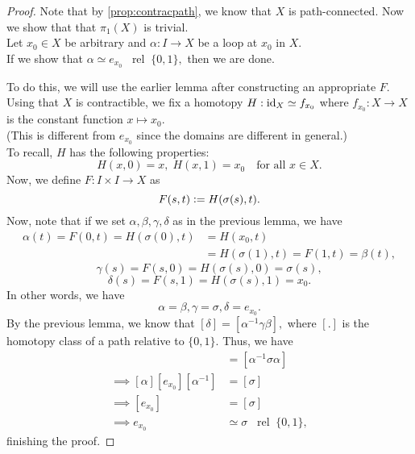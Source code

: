 \documentclass[12pt]{article}
\newcommand{\rel}{\;\;\operatorname{rel}\;}
\begin{document}
\begin{proof} 
	Note that by \cref{prop:contracpath}, we know that $X$ is path-connected. Now we show that that $\pi_1(X)$ is trivial.\\
	Let $x_0 \in X$ be arbitrary and $\alpha:I\to X$ be a loop at $x_0$ in $X.$\\
	If we show that $\alpha \simeq e_{x_0} \rel \{0, 1\},$ then we are done.

	To do this, we will use the earlier lemma after constructing an appropriate $F.$\\
	Using that $X$ is contractible, we fix a homotopy $H:\operatorname{id}_X \simeq f_{x_0}$ where $f_{x_0}:X\to X$ is the constant function $x \mapsto x_0.$\\
	(This is different from $e_{x_0}$ since the domains are different in general.)\\
	To recall, $H$ has the following properties:
	\begin{equation*} 
		H(x, 0) = x,\; H(x, 1) = x_0 \quad \text{for all } x \in X.
	\end{equation*}
	Now, we define $F:I\times I \to X$ as 
	\begin{equation*} 
		F(s, t) \vcentcolon= H(\sigma(s), t).
	\end{equation*}
	Now, note that if we set $\alpha, \beta, \gamma, \delta$ as in the previous lemma, we have
	\begin{align*} 
		\alpha(t) = F(0, t) = H(\sigma(0), t) &= H(x_0, t)\\
		&= H(\sigma(1), t) = F(1, t) = \beta(t),
	\end{align*}
	\begin{equation*} 
		\gamma(s) = F(s, 0) = H(\sigma(s), 0) = \sigma(s),
	\end{equation*}
	\begin{equation*} 
		\delta(s) = F(s, 1) = H(\sigma(s), 1) = x_0.
	\end{equation*}
	In other words, we have
	\begin{equation*} 
		\alpha = \beta, \gamma = \sigma, \delta = e_{x_0}.
	\end{equation*}
	By the previous lemma, we know that $[\delta] = [\alpha^{-1}\gamma\beta],$ where $[.]$ is the homotopy class of a path relative to $\{0, 1\}.$ Thus, we have
	\begin{align*} 
		[e_{x_0}] &= [\alpha^{-1}\sigma\alpha]\\
		\implies [\alpha][e_{x_0}][\alpha^{-1}] &= [\sigma]\\
		\implies [e_{x_0}] &= [\sigma]\\
		\implies e_{x_0} &\simeq \sigma \rel \{0, 1\},
	\end{align*}
	finishing the proof.
\end{proof}
\end{document}
